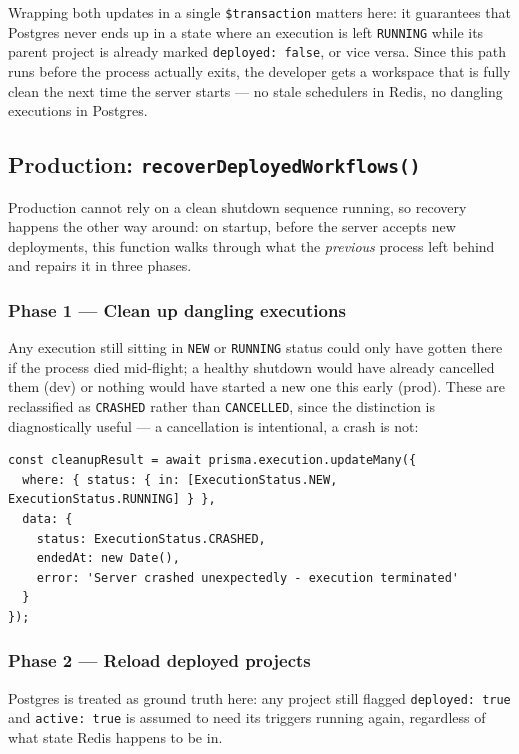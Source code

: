 Wrapping both updates in a single \texttt{\$transaction} matters here: it guarantees that Postgres never ends up in a state where an execution 
is left \texttt{RUNNING} while its parent project is already marked \texttt{deployed: false}, or vice versa. Since this path runs before the process actually exits, the developer gets a workspace that is fully clean the next time the server starts — no stale schedulers in Redis, no dangling executions in Postgres.

\subsection{Production: \texttt{recoverDeployedWorkflows()}}

Production cannot rely on a clean shutdown sequence running, so recovery happens the other way around: on startup, before the server accepts
 new deployments, this function walks through what the \emph{previous} process left behind and repairs it in three phases.

\subsubsection{Phase 1 --- Clean up dangling executions}

Any execution still sitting in \texttt{NEW} or \texttt{RUNNING} status could only have gotten there if the process died mid-flight; a healthy
 shutdown would have already cancelled them (dev) or nothing would have started a new one this early (prod). These are reclassified as \texttt{CRASHED} 
 rather than \texttt{CANCELLED}, since the distinction is diagnostically useful — a cancellation is intentional, a crash is not:

\begin{lstlisting}
const cleanupResult = await prisma.execution.updateMany({
  where: { status: { in: [ExecutionStatus.NEW, ExecutionStatus.RUNNING] } },
  data: {
    status: ExecutionStatus.CRASHED,
    endedAt: new Date(),
    error: 'Server crashed unexpectedly - execution terminated'
  }
});
\end{lstlisting}

\subsubsection{Phase 2 --- Reload deployed projects}

Postgres is treated as ground truth here: any project still flagged \texttt{deployed: true} and \texttt{active: true} is assumed to need its 
triggers running again, regardless of what state Redis happens to be in.

